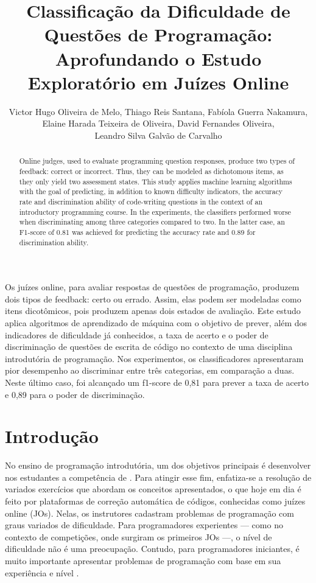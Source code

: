 \documentclass[12pt]{article}
\title{Classificação da Dificuldade de Questões de Programação: Aprofundando o Estudo Exploratório em Juízes Online}
\author{Victor Hugo Oliveira de Melo, Thiago Reis Santana, Fabíola Guerra Nakamura,\\Elaine Harada Teixeira de Oliveira, David Fernandes Oliveira,\\Leandro Silva Galvão de Carvalho}
\begin{document}
\maketitle

\begin{resumo}
Os juízes online, para avaliar respostas de questões de programação, produzem dois tipos de feedback: certo ou errado. Assim, elas podem ser modeladas como itens dicotômicos, pois produzem apenas dois estados de avaliação. Este estudo aplica algoritmos de aprendizado de máquina com o objetivo de prever, além dos indicadores de dificuldade já conhecidos, a taxa de acerto e o poder de discriminação de questões de escrita de código no contexto de uma disciplina introdutória de programação. Nos experimentos, os classificadores apresentaram pior desempenho ao discriminar entre três categorias, em comparação a duas. Neste último caso, foi alcançado um f1-score de 0,81 para prever a taxa de acerto e 0,89 para o poder de discriminação.
\end{resumo}

\begin{abstract}
Online judges, used to evaluate programming question responses, produce two types of feedback: correct or incorrect. Thus, they can be modeled as dichotomous items, as they only yield two assessment states. This study applies machine learning algorithms with the goal of predicting, in addition to known difficulty indicators, the accuracy rate and discrimination ability of code-writing questions in the context of an introductory programming course. In the experiments, the classifiers performed worse when discriminating among three categories compared to two. In the latter case, an F1-score of 0.81 was achieved for predicting the accuracy rate and 0.89 for discrimination ability.
\end{abstract}

\section{Introdução}

No ensino de programação introdutória, um dos objetivos principais é desenvolver nos estudantes a competência de  \cite{referenciaisSBC2017}. Para atingir esse fim, enfatiza-se a resolução de variados exercícios que abordam os conceitos apresentados, o que hoje em dia é feito por plataformas de correção automática de códigos, conhecidas como juízes online (JOs). Nelas, os instrutores cadastram problemas de programação com graus variados de dificuldade. Para programadores experientes --- como no contexto de competições, onde surgiram os primeiros JOs \cite{Wasik2018} ---, o nível de dificuldade não é uma preocupação. Contudo, para programadores iniciantes, é muito importante apresentar problemas de programação com base em sua experiência e nível \cite{zhao2018}.
\end{document}
